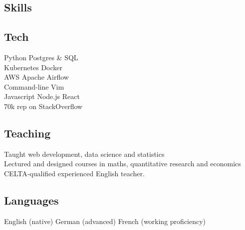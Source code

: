 \documentclass[a4paper,nomath]{deedy-resume} %
\begin{document}
\begin{paracol}{2}
    \sectionspace %



\switchcolumn
%


    \section{Skills}

    \subsection{Tech}

    Python \textbullet{} Postgres \& SQL \\
    Kubernetes \textbullet{} Docker \\
    AWS \textbullet{} Apache Airflow \\
    Command-line \textbullet{} Vim \\
    Javascript \textbullet{} Node.js \textbullet{} React \\
    70k rep on StackOverflow \\

    \sectionspace %

    \subsection{Teaching}
    \textbullet{} Taught web development, data science and statistics \\
    \textbullet{} Lectured and designed courses in maths, quantitative research and economics \\
    \textbullet{} CELTA-qualified experienced English teacher. \\
    
    \sectionspace %

    \subsection{Languages}
    English (native) \textbullet{} German (advanced) \textbullet{} French (working proficiency)


\end{paracol}
\end{document}
